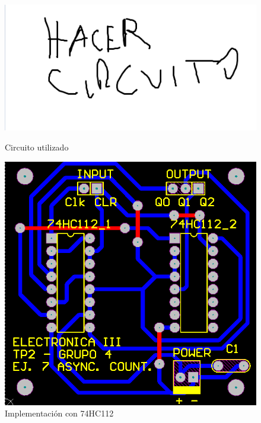 \begin{figure}[H]
\begin{center}
  \begin{minipage}[b]{0.4\textwidth}
  	\begin{center}
  		\includegraphics[scale=0.25]{ejercicio7/imagenes/asynccircuito.png}
  	\end{center}
  \caption{Circuito utilizado}
  \label{7_fig1}
  \end{minipage}
  \begin{minipage}[b]{0.4\textwidth}
    \begin{center}
  		\includegraphics[scale=0.25]{ejercicio7/imagenes/asyncaltium.png}
	\end{center}
  \caption{Implementaci\'on con 74HC112}
  \label{7_fig2}
 \end{minipage}
\end{center}
\end{figure}


